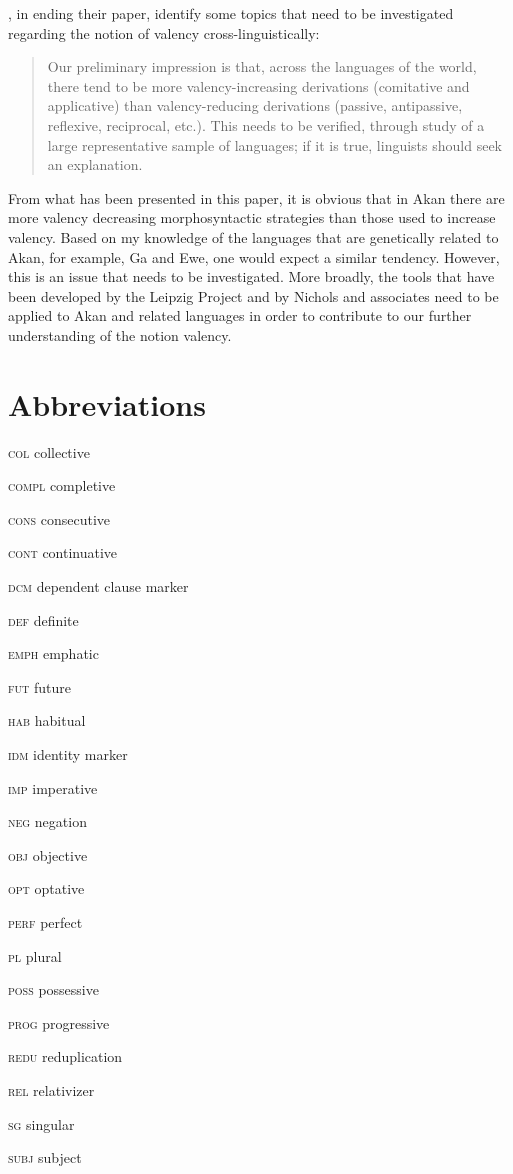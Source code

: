 \documentclass[output=paper]{langsci/langscibook}
\begin{document}
\citet[25-27]{dixonaikhenvald2000b}, in ending their paper, identify some topics that need to be investigated regarding the notion of valency cross-linguistically:

\begin{quote}
Our preliminary impression is that, across the languages of the world, there tend to be more valency-increasing derivations (comitative and applicative) than valency-reducing derivations (passive, antipassive, reflexive, reciprocal, etc.). This needs to be verified, through study of a large representative sample of languages; if it is true, linguists should seek an explanation. \citep[26]{dixonaikhenvald2000b}  
\end{quote}

From what has been presented in this paper, it is obvious that in Akan there are more valency decreasing morphosyntactic strategies than those used to increase valency. Based on my knowledge of the languages that are genetically related to Akan, for example, Ga and Ewe, one would expect a similar tendency. However, this is an issue that needs to be investigated. More broadly, the tools that have been developed by the Leipzig Project and by Nichols and associates need to be applied to Akan and related languages in order to contribute to our further understanding of the notion valency.

\section*{Abbreviations}

\textsc{col}   collective

\textsc{compl}  completive

\textsc{cons}  consecutive

\textsc{cont}  continuative

\textsc{dcm}   dependent clause marker

\textsc{def}   definite

\textsc{emph}  emphatic

\textsc{fut}  future

\textsc{hab}  habitual

\textsc{idm}  identity marker

\textsc{imp}  imperative

\textsc{neg}  negation

\textsc{obj}  objective

\textsc{opt}  optative

\textsc{perf}  perfect

\textsc{pl}  plural

\textsc{poss}  possessive

\textsc{prog}  progressive

\textsc{redu}  reduplication

\textsc{rel} relativizer

\textsc{sg} singular

\textsc{subj} subject



{\sloppy
\printbibliography[heading=subbibliography,notkeyword=this]
}
\end{document}
